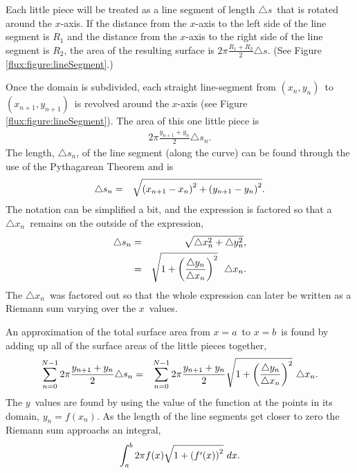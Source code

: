 Each little piece will be treated as a line segment of length
$\triangle s$\ that is rotated around the $x$-axis. If the distance
from the $x$-axis to the left side of the line segment is $R_1$ and
the distance from the $x$-axis to the right side of the line segment
is $R_2$, the area of the resulting surface is
$2\pi\frac{R_1+R_2}{2}\triangle s$. (See Figure
\ref{flux:figure:lineSegment}.)

Once the domain is subdivided, each straight line-segment from
$(x_n,y_n)$\ to $(x_{n+1},y_{n+1})$\ is revolved around the $x$-axis
(see Figure \ref{flux:figure:lineSegment}). The area of this one little
piece is
\begin{eqnarray*}
  2 \pi \frac{y_{n+1}+y_n}{2} \triangle s_n.
\end{eqnarray*}
The length, $\triangle s_n$, of the line segment (along the curve) can
be found through the use of the Pythagarean Theorem and is
\begin{eqnarray*}
  \triangle s_n & = & \sqrt{\left( x_{n+1}-x_n \right)^2 +
    \left( y_{n+1}-y_n \right)^2}.
\end{eqnarray*}
The notation can be simplified a bit, and the expression is factored
so that a $\triangle x_n$\ remains on the outside of the expression,
\begin{eqnarray*}
\triangle s_n  & = & \sqrt{ \triangle x_n^2 +  \triangle y_n^2}, \\
  & = & \sqrt{ 1 +  \left( \frac{\triangle y_n}{\triangle x_n} \right)^2}
  ~~ \triangle x_n.
\end{eqnarray*}
The $\triangle x_n$\ was factored out so that the whole expression can
later be written as a Riemann sum varying over the $x$\ values.

An approximation of the total surface area from $x=a$\ to $x=b$\ is
found by adding up all of the surface areas of the little pieces
together,
\begin{eqnarray}
  \sum^{N-1}_{n=0} 2 \pi \frac{y_{n+1}+y_n}{2}\triangle s_n & = &
  \sum^{N-1}_{n=0} 2 \pi \frac{y_{n+1}+y_n}{2}
  \sqrt{ 1 +  \left( \frac{\triangle y_n}{\triangle x_n} \right)^2} ~ \triangle x_n.
  \label{flux:eqn:riemann}
\end{eqnarray}
The $y$\ values are found by using the value of the function at the
points in its domain, $y_n=f(x_n)$. As the length of the line segments
get closer to zero the Riemann sum approachs an integral,
\begin{eqnarray*}
  \int^b_a 2 \pi f(x) \sqrt{1+\left( f'(x)\right)^2} ~ dx.
\end{eqnarray*}




